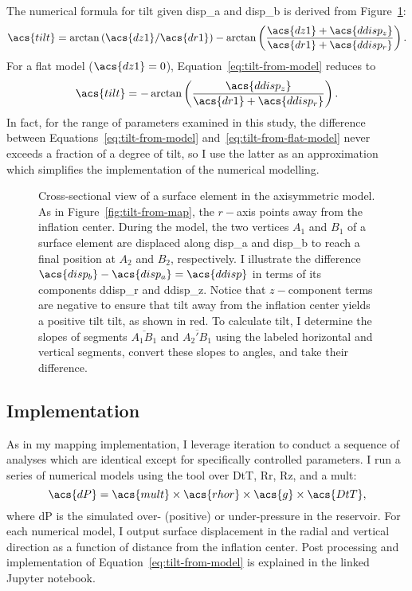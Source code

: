The numerical formula for \acf{tilt} given \acs{disp_a} and \acs{disp_b} is derived from Figure~\ref{fig:tilt-from-model}:
\begin{equation}
    \acs{tilt} = \arctan\left({\acs{dz1}}/{\acs{dr1}}\right) - \arctan\left(\dfrac{\acs{dz1}+\acs{ddisp_z}}{\acs{dr1}+\acs{ddisp_r}}\right).\label{eq:tilt-from-model}
\end{equation}
For a flat model ($\acs{dz1} = 0$), Equation~\eqref{eq:tilt-from-model} reduces to
\begin{equation}
    \acs{tilt} = 
    -\arctan\left(\dfrac{\acs{ddisp_z}}{\acs{dr1}+\acs{ddisp_r}}\right).\label{eq:tilt-from-flat-model}
\end{equation}
In fact, for the range of parameters examined in this study, the difference between Equations~\eqref{eq:tilt-from-model} and~\eqref{eq:tilt-from-flat-model} never exceeds a fraction of a degree of tilt, so I use the latter as an approximation which simplifies the implementation of the numerical modelling.

\begin{figure}
    \caption[\Acl{tilt} from modelling]{Cross-sectional view of a surface element in the axisymmetric model. As in Figure~\ref{fig:tilt-from-map}, the $r-$axis points away from the inflation center. During the model, the two vertices $A_1$ and $B_1$ of a surface element are displaced along \acs{disp_a} and \acs{disp_b} to reach a final position at $A_2$ and $B_2$, respectively. I illustrate the difference $\acs{disp_b} - \acs{disp_a} = \acs{ddisp}$ in terms of its components \acs{ddisp_r} and \acs{ddisp_z}. Notice that $z-$component terms are negative to ensure that tilt away from the inflation center yields a positive tilt \acs{tilt}, as shown in red. To calculate \acs{tilt}, I determine the slopes of segments $\overline{A_1B_1}$ and $\overline{A_2'B_1}$ using the labeled horizontal and vertical segments, convert these slopes to angles, and take their difference.}%
    \label{fig:tilt-from-model}%
\end{figure}

\subsection{Implementation}

As in my mapping implementation, I leverage iteration to conduct a sequence of analyses which are identical except for specifically controlled parameters. I run a series of numerical models using the  tool over \ac{DtT}, \ac{Rr}, \ac{Rz}, and a \ac{mult}:
\begin{equation}
    \acs{dP}=\acs{mult}\times\acs{rhor}\times\acs{g}\times\acs{DtT},
\end{equation}
where \acs{dP} is the simulated over- (positive) or under-pressure in the reservoir. For each numerical model, I output surface displacement in the radial and vertical direction as a function of distance from the inflation center. Post processing and implementation of Equation~\eqref{eq:tilt-from-model} is explained in the linked Jupyter notebook.